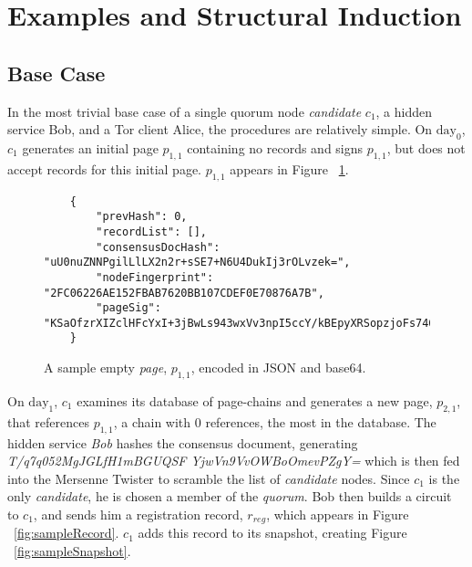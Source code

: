 \section{Examples and Structural Induction}

\subsection{Base Case}

In the most trivial base case of a single quorum node \emph{candidate} $ c_{1} $, a hidden service Bob, and a Tor client Alice, the procedures are relatively simple. On $ \textrm{day}_{0} $, $ c_{1} $ generates an initial page $ p_{1,1} $ containing no records and signs $ p_{1,1} $, but does not accept records for this initial page. $ p_{1,1} $ appears in Figure ~\ref{fig:emptyPage}.

\begin{figure}
	\begin{lstlisting}
	{
		"prevHash": 0,
		"recordList": [],
		"consensusDocHash": "uU0nuZNNPgilLlLX2n2r+sSE7+N6U4DukIj3rOLvzek=",
		"nodeFingerprint": "2FC06226AE152FBAB7620BB107CDEF0E70876A7B",
		"pageSig": "KSaOfzrXIZclHFcYxI+3jBwLs943wxVv3npI5ccY/kBEpyXRSopzjoFs746n0tJqUpdY4Kbe6DBwERaN7ELmSSK9Pu6q8QeKzNAh+QOnKl0fKBN7fqowjkQ3ktFkR0Vuox9WrrbNTMa4+up0Np52hlbKA3zSRz4fbR9NVlh6uuQ="
	}
	\end{lstlisting}
	\caption{A sample empty \emph{page}, $ p_{1,1} $, encoded in JSON and base64.}
	\label{fig:emptyPage}
\end{figure}

On $ \textrm{day}_{1} $, $ c_{1} $ examines its database of page-chains and generates a new page, $ p_{2,1} $, that references $ p_{1,1} $, a chain with 0 references, the most in the database. The hidden service \emph{Bob} hashes the consensus document, generating \emph{T/q7q052MgJGLfH1mBGUQSF YjwVn9VvOWBoOmevPZgY=} which is then fed into the Mersenne Twister to scramble the list of \emph{candidate} nodes. Since $ c_{1} $ is the only \emph{candidate}, he is chosen a member of the \emph{quorum}. Bob then builds a circuit to $ c_{1} $, and sends him a registration record, $ r_{reg} $, which appears in Figure ~\ref{fig:sampleRecord}. $ c_{1} $ adds this record to its snapshot, creating Figure ~\ref{fig:sampleSnapshot}.

